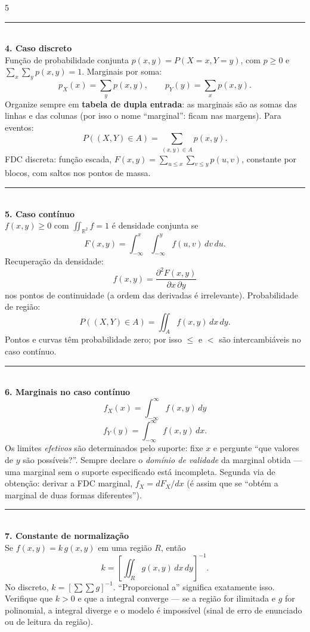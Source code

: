 \documentclass[a4paper,8pt]{extarticle}
\newcommand{\tit}[1]{\vspace{2pt}\textcolor{azul}{\rule{\linewidth}{0.6pt}}\\[1pt]\textbf{\textcolor{azul}{#1}}\\[1pt]}
\newcommand{\Rr}{\mathbb{R}}
\begin{document}
\begin{multicols*}{5}
\tit{4. Caso discreto}
Função de probabilidade conjunta $p(x,y)=P(X=x,Y=y)$, com $p\ge0$ e $\sum_x\sum_y p(x,y)=1$. Marginais por soma:
\[p_X(x)=\sum_y p(x,y),\qquad p_Y(y)=\sum_x p(x,y).\]
Organize sempre em \textbf{tabela de dupla entrada}: as marginais são as somas das linhas e das colunas (por isso o nome “marginal”: ficam nas margens). Para eventos:
\[P((X,Y)\in A)=\sum_{(x,y)\in A}p(x,y).\]
FDC discreta: função escada, $F(x,y)=\sum_{u\le x}\sum_{v\le y}p(u,v)$, constante por blocos, com saltos nos pontos de massa.

\tit{5. Caso contínuo}
$f(x,y)\ge0$ com $\iint_{\Rr^2}f=1$ é densidade conjunta se
\[F(x,y)=\int_{-\infty}^{x}\!\!\int_{-\infty}^{y}f(u,v)\,dv\,du .\]
Recuperação da densidade:
\[f(x,y)=\frac{\partial^2 F(x,y)}{\partial x\,\partial y}\]
nos pontos de continuidade (a ordem das derivadas é irrelevante). Probabilidade de região:
\[P((X,Y)\in A)=\iint_A f(x,y)\,dx\,dy .\]
Pontos e curvas têm probabilidade zero; por isso $\le$ e $<$ são intercambiáveis no caso contínuo.

\tit{6. Marginais no caso contínuo}
\[f_X(x)=\int_{-\infty}^{\infty} f(x,y)\,dy\]
\[f_Y(y)=\int_{-\infty}^{\infty} f(x,y)\,dx .\]
Os limites \emph{efetivos} são determinados pelo suporte: fixe $x$ e pergunte “que valores de $y$ são possíveis?”. Sempre declare o \emph{domínio de validade} da marginal obtida — uma marginal sem o suporte especificado está incompleta. Segunda via de obtenção: derivar a FDC marginal, $f_X=dF_X/dx$ (é assim que se “obtém a marginal de duas formas diferentes”).

\tit{7. Constante de normalização}
Se $f(x,y)=k\,g(x,y)$ em uma região $R$, então
\[k=\left[\iint_R g(x,y)\,dx\,dy\right]^{-1}.\]
No discreto, $k=[\sum\sum g]^{-1}$. “Proporcional a” significa exatamente isso. Verifique que $k>0$ e que a integral converge — se a região for ilimitada e $g$ for polinomial, a integral diverge e o modelo é impossível (sinal de erro de enunciado ou de leitura da região).


\end{multicols*}
\end{document}
